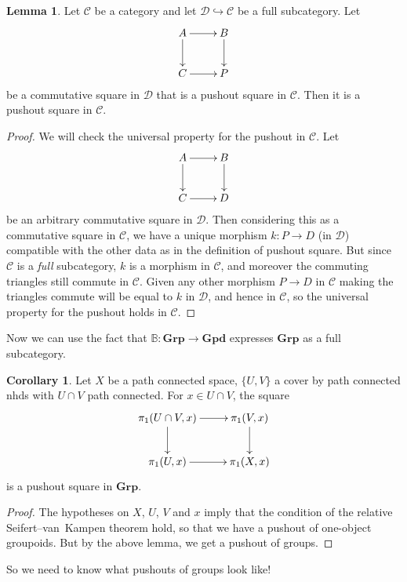 \documentclass{tufte-handout}
\def\into {\hookrightarrow}
\def\cC {\mathcal{C}}
\def\cD {\mathcal{D}}
\def\Grp {\mathbf{Grp}}
\def\Gpd {\mathbf{Gpd}}
\theoremstyle{definition}
\newtheorem{lemma}{Lemma}
\newtheorem{corollary}{Corollary}
\begin{document}
\begin{lemma}
Let $\cC$ be a category and let $\cD \into \cC$ be a full subcategory. Let
\[
\xymatrix{
	A\ar[r] \ar[d] & B \ar[d]\\
	C \ar[r] & P
}
\]
be a commutative square in $\cD$ that is a pushout square in $\cC$. Then it is a pushout
square in $\cC$.
\end{lemma}

\begin{proof}
We will check the universal property for the pushout in $\cC$. Let
\[
\xymatrix{
	A\ar[r] \ar[d] & B \ar[d] \\
	C \ar[r] & D
}
\]
be an arbitrary commutative square in $\cD$. Then considering this as a commutative 
square in $\cC$, we have a unique morphism $k\colon P\to D$ (in $\cD$) compatible with 
the other data as in the definition of pushout square. But since $\cC$ is a \emph{full} 
subcategory, $k$ is a morphism in $\cC$, and moreover the commuting triangles still 
commute in $\cC$. Given any other morphism $P\to D$ in $\cC$ making the triangles commute will
be equal to $k$ in $\cD$, and hence in $\cC$, so the universal property for the pushout
holds in $\cC$.
\end{proof}

Now we can use the fact that $\mathbb{B}\colon \Grp \to \Gpd$ expresses $\Grp$ as a full 
subcategory.

\begin{corollary}
Let $X$ be a path connected space, $\{U,V\}$ a cover by path connected nhds with 
$U\cap V$ path connected. For $x\in U\cap V$, the square
\[
\xymatrix{
	\pi_1(U\cap V,x) \ar[r] \ar[d] & \pi_1(V,x) \ar[d]\\
	\pi_1(U,x) \ar[r] & \pi_1(X,x)
}
\]
is a pushout square in $\Grp$.
\end{corollary}

\begin{proof}
The hypotheses on $X$, $U$, $V$ and $x$ imply that the condition of the relative 
Seifert--van~Kampen theorem hold, so that we have a pushout of one-object groupoids. But 
by the above lemma, we get a pushout of groups.
\end{proof}

So we need to know what pushouts of groups look like!
\end{document}
